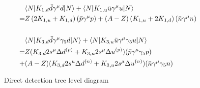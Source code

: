 \begin{align}
	&\langle N|K_{1,d}\bar{d}\gamma^\mu d|N\rangle + \langle N|K_{1,u}\bar{u}\gamma^\mu u|N\rangle\notag \\
	= &Z\left(2K_{1,u}+K_{1,d}\right)(\bar{p}\gamma^\mu p) + (A-Z)\left(K_{1,u}+2K_{1,d}\right)(\bar{n}\gamma^\mu n)\notag \\
	\notag \\
	&\langle N|K_{3,d}\bar{d}\gamma^\mu\gamma_5 d|N\rangle + \langle N|K_{3,u}\bar{u}\gamma^\mu\gamma_5 u|N\rangle\notag \\
	= &Z(K_{3,d}2s^\mu\Delta d^{(p)} + K_{3,u}2s^\mu\Delta u^{(p)})(\bar{p}\gamma^\mu\gamma_5 p)\notag \\
	+ &(A-Z)(K_{3,d}2s^\mu\Delta d^{(n)} + K_{3,u}2s^\mu\Delta u^{(n)})(\bar{n}\gamma^\mu\gamma_5 n)\notag
\end{align}
\begin{figure}
	\centering
	
	\caption{Direct detection tree level diagram}
	\label{fig:DD}
\end{figure}

